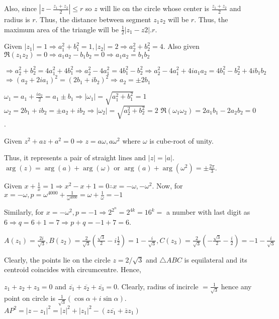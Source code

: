   Also, since $\left|z - \frac{z_1 + z_2}{2}\right|\leq r$ so $z$ will lie on the circle whose center is
  $\frac{z_1 + z_2}{2}$ and radius is $r$. Thus, the distance between segment $z_1z_2$ will be $r$.
  Thus, the maximum area of the triangle will be $\frac{1}{2}|z_1 - z2|.r$.
\item Given $|z_1| = 1 \Rightarrow a_1^2 + b_1^2 = 1, |z_2| = 2 \Rightarrow a_2^2 + b_2^2 = 4$.
  Also given $\Re(z_1z_2) = 0 \Rightarrow a_1a_2 - b_1b_2 = 0 \Rightarrow a_1a_2 = b_1b_2$

  $\Rightarrow a_2^2 + b_2^2 = 4a_1^2 + 4b_1^2 \Rightarrow a_2^2 - 4a_1^2 = 4b_1^2 - b_2^2 \Rightarrow a_2^2
  - 4a_1^2 + 4ia_1a_2 = 4b_1^2 - b_2^2 + 4ib_1b_2$
  $\Rightarrow (a_2 + 2ia_1)^2 = (2b_1 + ib_2)^2 \Rightarrow a_2 = \pm 2b_1$

  $\omega_1 = a_1 + \frac{ia_2}{2} = a_1 \pm b_1 \Rightarrow |\omega_1| = \sqrt{a_1^2 + b_1^2} = 1$
  $\omega_2 = 2b_1 + ib_2 = \pm a_2 + ib_2 \Rightarrow |\omega_2| = \sqrt{a_2^2 + b_2^2} = 2$
  $\Re(\omega_1\omega_2) = 2a_1b_1 - 2a_2b_2 = 0$.
\item Given $z^2 + az + a^2 = 0 \Rightarrow z = a\omega, a\omega^2$ where $\omega$ is cube-root of unity.

  Thus, it represents a pair of straight lines and $|z| = |a|$.
  $\arg(z) = \arg(a) + \arg(\omega)$ or $\arg(a) + \arg(\omega^2) = \pm \frac{2\pi}{3}$.
\item Given $x + \frac{1}{x} = 1 \Rightarrow x^2 - x + 1 = 0 \therefore x = -\omega, -\omega^2$.  Now, for
  $x = -\omega, p = \omega^{4000} + \frac{1}{\omega^{4000}} = \omega + \frac{1}{\omega} = -1$

  Similarly, for $x = -\omega^2, p = -1\Rightarrow 2^{2^n} = 2^{4k} = 16^k =$ a number with last digit as $6
  \Rightarrow q = 6 + 1 = 7\Rightarrow p + q = -1 + 7 = 6$.
\item $A(z_1) = \frac{2i}{\sqrt{3}},B(z_2) = \frac{2}{\sqrt{3}}\left(\frac{\sqrt{3}}{2} -
  i\frac{1}{2}\right) = 1 - \frac{i}{\sqrt{3}}, C(z_3) = \frac{2}{\sqrt{3}}\left(-\frac{\sqrt{3}}{2} -
  \frac{i}{2}\right) = -1-\frac{i}{\sqrt{3}}$

  Clearly, the points lie on the circle $z=2/\sqrt{3}$ and $\triangle ABC$ is equilateral and its centroid
  coincides with circumcentre. Hence,

  $z_1 + z_2 + z_3 = 0$ and $\overline{z_1} + \overline{z_2} + \overline{z_3} = 0$.
  Clearly, radius of incircle $= \frac{1}{\sqrt{3}}$ hence any point on circle is
  $\frac{1}{\sqrt{3}}(\cos\alpha + i\sin\alpha)$. $AP^2 = |z - z_1|^2 = |z|^2 + |z_1|^2 - (z\overline{z_1} +
  \overline{z}z_1)$

